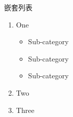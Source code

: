 \documentclass{ctexbeamer}
\begin{document}
\begin{frame}{嵌套列表}

\begin{enumerate}
  \item One
  \begin{itemize}
    \item Sub-category
    \item Sub-category
    \item Sub-category
  \end{itemize}
  \item Two
  \item Three
\end{enumerate}

\end{frame}
\end{document}
